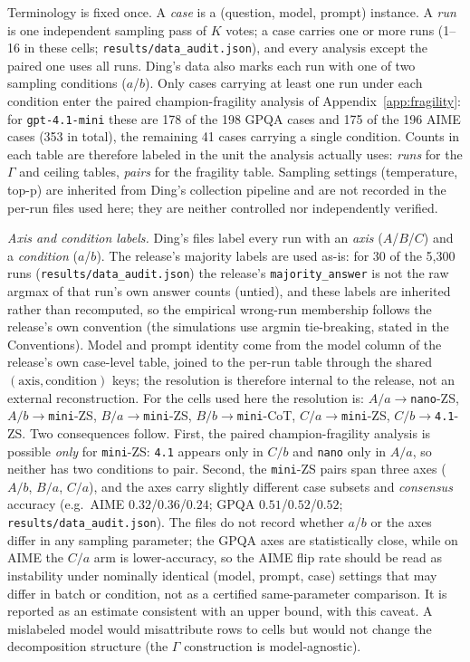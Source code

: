 \documentclass[a4paper,fleqn]{cas-sc}
\newcommand{\agreementIndex}{\Gamma}
\begin{document}
Terminology is fixed once. A \emph{case} is a (question, model, prompt)
instance. A \emph{run} is one independent sampling pass of $K$ votes; a case
carries one or more runs (1--16 in these cells; \texttt{results/data\_audit.json}), and every analysis
except the paired one uses all runs. Ding's data also marks each
run with one of two sampling conditions ($a$/$b$). Only cases carrying at
least one run under each condition enter the paired
champion-fragility analysis of Appendix~\ref{app:fragility}: for
\texttt{gpt-4.1-mini} these are 178 of the 198 GPQA cases and 175 of the
196 AIME cases (353 in total), the remaining 41 cases carrying a single
condition. Counts in each table are therefore labeled in the unit the
analysis actually uses: \emph{runs} for the $\agreementIndex$ and ceiling tables,
\emph{pairs} for the fragility table. Sampling settings (temperature,
top-p) are inherited from Ding's collection pipeline and are
not recorded in the per-run files used here; they are neither controlled nor independently verified.

\emph{Axis and condition labels.}
Ding's files label every run with an \emph{axis} ($A$/$B$/$C$) and a
\emph{condition} ($a$/$b$). The release's majority labels are used as-is:
for 30 of the 5,300 runs (\texttt{results/data\_audit.json}) the release's \texttt{majority\_answer} is not
the raw argmax of that run's own answer counts (untied), and these labels are inherited rather than recomputed, so the empirical wrong-run
membership follows the release's own convention (the simulations use
argmin tie-breaking, stated in the Conventions). Model and prompt identity come from the
model column of the release's own case-level table, joined to the
per-run table through the shared $(\text{axis},\text{condition})$ keys;
the resolution is therefore internal to the release, not an external
reconstruction. For the cells used here the resolution is:
$A/a\!\to\!$\texttt{nano}-ZS, $A/b\!\to\!$\texttt{mini}-ZS,
$B/a\!\to\!$\texttt{mini}-ZS, $B/b\!\to\!$\texttt{mini}-CoT,
$C/a\!\to\!$\texttt{mini}-ZS, $C/b\!\to\!$\texttt{4.1}-ZS. Two
consequences follow. First, the paired champion-fragility analysis is
possible \emph{only} for \texttt{mini}-ZS: \texttt{4.1} appears only in
$C/b$ and \texttt{nano} only in $A/a$, so neither has two conditions to
pair. Second, the \texttt{mini}-ZS pairs span three axes ($A/b$, $B/a$,
$C/a$), and the axes carry slightly different case subsets and
\emph{consensus} accuracy
(e.g.\ AIME $0.32$/$0.36$/$0.24$; GPQA $0.51$/$0.52$/$0.52$; \texttt{results/data\_audit.json}).
The files do not record whether $a$/$b$ or the axes differ in any
sampling parameter; the GPQA axes are statistically close, while on AIME
the $C/a$ arm is lower-accuracy, so the AIME flip rate should be read as
instability under nominally identical (model, prompt, case) settings
that may differ in batch or condition, not as a certified same-parameter
comparison. It is reported as an estimate consistent with an upper bound, with this caveat. A mislabeled model would misattribute rows to cells but would
not change the decomposition structure (the $\agreementIndex$ construction is
model-agnostic).
\end{document}
